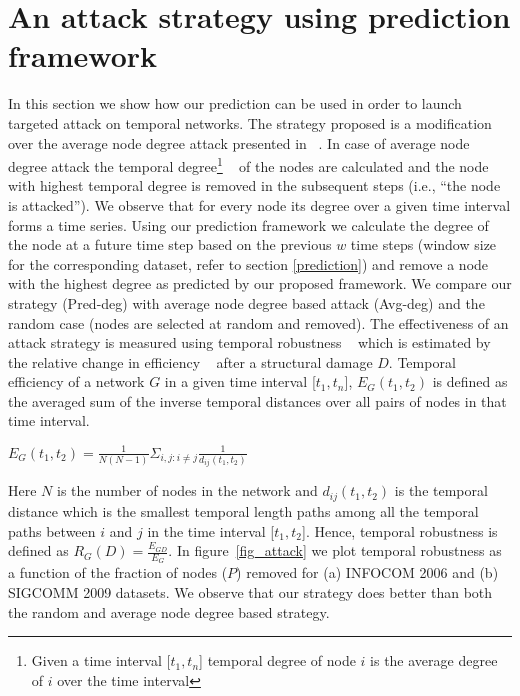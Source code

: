 \noindent

\section{An attack strategy using prediction framework}
\label{attack}
In this section we show how our prediction can be used in order to launch targeted attack on temporal networks. The strategy proposed is a modification over the average node degree attack presented in ~\cite{trajanovski2012error}. 
In case of average node degree attack the temporal degree\footnote{Given a time interval [$t_1, t_n$] temporal degree of node $i$ is the average degree of $i$ over the time interval}  
~\cite{trajanovski2012error} of the nodes are calculated and the node with highest temporal degree is removed in the 
subsequent steps (i.e., ``the node is attacked''). 
We observe that for every 
node its degree over a given time interval forms a time series. Using our prediction framework we calculate the degree of the node at a future time step based on the previous 
$w$ time steps (window size for the corresponding dataset, refer to section \ref{prediction})
and remove a node with the 
highest degree as predicted by our proposed framework. We compare our strategy (Pred-deg) with average node degree based attack (Avg-deg) and the random case (nodes are selected at random 
and removed). 
The effectiveness of an attack strategy is measured using temporal robustness ~\cite{trajanovski2012error} which is estimated by the relative change in efficiency ~\cite{trajanovski2012error} 
after a structural damage $D$. 
Temporal efficiency of a network $G$ in a given time interval [$t_1,t_n$], $E_G(t_1,t_2)$ is defined as the averaged sum of the inverse temporal distances over all pairs of 
nodes in that time interval. 
\begin{center}
 $E_G(t_1,t_2)=\frac{1}{N(N-1)}\Sigma_{i,j:i\neq j}\frac{1}{d_{ij}(t_1,t_2)}$
\end{center}
Here $N$ is the number of nodes in the network and $d_{ij}(t_1,t_2)$ is the temporal distance which is the smallest temporal length paths among all the temporal
paths between $i$ and $j$ in the time interval [$t_1,t_2$]. Hence, temporal robustness is defined  as $R_G(D)=\frac{E_{GD}}{E_G}$. 
In figure~\ref{fig_attack} we plot temporal robustness 
as a function of the fraction of nodes ($P$) removed 
for (a) INFOCOM 2006 and (b) SIGCOMM 2009 datasets. 
We observe that our strategy 
does better than both the random and average node degree based strategy. 

